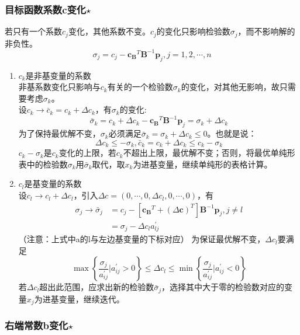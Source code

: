 \documentclass{book}
\begin{document}
\subsubsection{目标函数系数c变化$\star$}
若只有一个系数$c_j$变化，其他系数不变。$c_j$的变化只影响检验数$\sigma_j$，而不影响解的非负性。
$$\sigma_j=c_j-\boldsymbol{c_B}^T\boldsymbol{B}^{-1}\boldsymbol{p}_j, j=1, 2, \cdots, n $$
\begin{enumerate}
    \item $c_k$是非基变量的系数\\
    非基系数变化只影响与$c_k$有关的一个检验数$\sigma_k$的变化，对其他无影响，故只需要考虑$\sigma_k$。\\
    设$c_k\rightarrow \bar{c}_k=c_k + \Delta c_k$，有$\sigma_k$的变化:$$\bar{\sigma}_k=c_k + \Delta c_k-\boldsymbol{c_B}^T\boldsymbol{B}^{-1}\boldsymbol{p}_j= \sigma_k+ \Delta c_k$$为了保持最优解不变，$\sigma_k$必须满足$\bar{\sigma}_k=\sigma_k+\Delta c_k\le 0$。也就是说：
    \begin{equation}
        \Delta c_k\le -\sigma_k,\bar{c}_k=c_k+\Delta c_k\le c_k-\sigma_k
        \label{con:2.3}
    \end{equation}
    $c_k-\sigma_k$是$c_k$变化的上限，若$c_k$不超出上限，最优解不变；否则，将最优单纯形表中的检验数$\sigma_k$用$\bar{\sigma}_k$取代，取$x_k$为进基变量，继续单纯形的表格计算。

    \item $c_l$是基变量的系数\\
    设$c_l\rightarrow c_l+\Delta c_l$，引入$\Delta c=(0, \cdots, 0, \Delta c_l, 0, \cdots, 0)$，有
    \begin{align*}
        \sigma_j\rightarrow\bar{\sigma}_j&=c_j-[\boldsymbol{c_B}^T+(\Delta\boldsymbol{c})^T]\boldsymbol{B}^{-1}\boldsymbol{p}_j,j\ne l\\
        &=\sigma_j-\Delta c_la_{lj}^{\prime}
    \end{align*}
    （注意：上式中a的l与左边基变量的下标对应）
    为保证最优解不变，$\Delta c_l$要满足$$\max\left\{ \frac{\sigma_j}{a_{ij}^{\prime}}|a_{ij}^{\prime}>0 \right\}\le\Delta c_l\le\min\left\{ \frac{\sigma_j}{a_{ij}^{\prime}}|a_{ij}^{\prime}<0 \right\}$$若$\Delta c_l$超出此范围，应求出新的检验数$\bar{\sigma}_j$，选择其中大于零的检验数对应的变量$x_j$为进基变量，继续迭代。
\end{enumerate}

\subsubsection{右端常数b变化$\star$}
\end{document}
